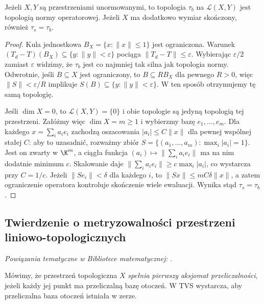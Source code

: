 \begin{twierdzenie}
\label{thm:op-b-norm}
Jeżeli $X,Y$ są przestrzeniami unormowanymi, to topologia
$\tau_b$ na $\mathcal L(X,Y)$ jest topologią normy
operatorowej. Jeżeli $X$ ma dodatkowo wymiar skończony,
również $\tau_s=\tau_b$.
\end{twierdzenie}
\begin{proof}
Kula jednostkowa $B_X=\{x:\|x\|\le1\}$ jest ograniczona.
Warunek $(T_d-T)(B_X)\subseteq\{y:\|y\|<\varepsilon\}$
pociąga $\|T_d-T\|\le\varepsilon$. Wybierając $\varepsilon/2$ zamiast $\varepsilon$ widzimy, że $\tau_b$ jest co najmniej tak silna jak topologia normy. Odwrotnie, jeśli
$B\subseteq X$ jest ograniczony, to
$B\subseteq RB_X$ dla pewnego $R>0$, więc
$\|S\|<\varepsilon/R$ implikuje $S(B)\subseteq
\{y:\|y\|<\varepsilon\}$. W ten sposób otrzymujemy
tę samą topologię.

Jeśli $\dim X=0$, to $\mathcal L(X,Y)=\{0\}$
i obie topologie są jedyną topologią tej przestrzeni.
Załóżmy więc $\dim X=m\geq1$ i wybierzmy bazę
$e_1,\ldots,e_m$. Dla każdego $x=\sum_i a_ie_i$
zachodzą oszacowania
$|a_i|\le C\|x\|$ dla pewnej wspólnej stałej $C$:
aby to uzasadnić, rozważmy zbiór
$S=\{(a_1,\ldots,a_m):\max_i|a_i|=1\}$.
Jest on zwarty w $\K^m$, a ciągła funkcja
$(a_i)\mapsto\|\sum_i a_ie_i\|$ ma na nim dodatnie
minimum $c$. Skalowanie daje
$\|\sum_i a_ie_i\|\ge c\max_i|a_i|$, co
wystarcza przy $C=1/c$.
Jeżeli $\|S e_i\|<\delta$ dla każdego $i$, to
$\|Sx\|\le mC\delta\|x\|$, a zatem ograniczenie
operatora kontroluje skończenie wiele ewaluacji.
Wynika stąd $\tau_s=\tau_b$.
\end{proof}

\subsection{Twierdzenie o metryzowalności przestrzeni liniowo-topologicznych}

\noindent\emph{Powiązania tematyczne w Bibliotece matematycznej:} .


\begin{definicja}
Mówimy, że przestrzeń topologiczna $X$
\emph{spełnia pierwszy aksjomat przeliczalności},
jeżeli każdy jej punkt ma przeliczalną bazę otoczeń. W TVS wystarcza, aby
przeliczalna baza otoczeń istniała w zerze.
\end{definicja}

